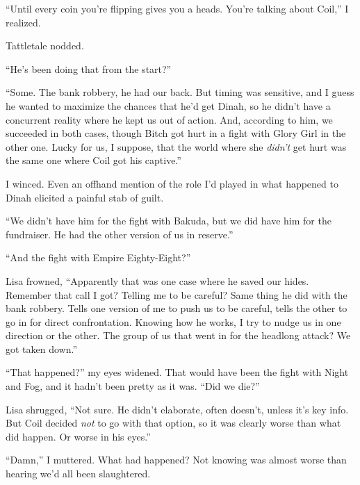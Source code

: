 ``Until every coin you're flipping gives you a heads.  You're talking about Coil,'' I realized.



Tattletale nodded.



``He's been doing that from the start?''



``Some.  The bank robbery, he had our back.  But timing was sensitive, and I guess he wanted to maximize the chances that he'd get Dinah, so he didn't have a concurrent reality where he kept us out of action.  And, according to him, we succeeded in both cases, though Bitch got hurt in a fight with Glory Girl in the other one.  Lucky for us, I suppose, that the world where she \emph{didn't }get hurt was the same one where Coil got his captive.''



I winced.  Even an offhand mention of the role I'd played in what happened to Dinah elicited a painful stab of guilt.



``We didn't have him for the fight with Bakuda, but we did have him for the fundraiser.  He had the other version of us in reserve.''



``And the fight with Empire Eighty-Eight?''



Lisa frowned, ``Apparently that was one case where he saved our hides.  Remember that call I got?  Telling me to be careful?  Same thing he did with the bank robbery.  Tells one version of me to push us to be careful, tells the other to go in for direct confrontation.  Knowing how he works, I try to nudge us in one direction or the other.  The group of us that went in for the headlong attack?  We got taken down.''



``That happened?'' my eyes widened.  That would have been the fight with Night and Fog, and it hadn't been pretty as it was.  ``Did we die?''



Lisa shrugged, ``Not sure.  He didn't elaborate, often doesn't, unless it's key info.  But Coil decided \emph{not} to go with that option, so it was clearly worse than what did happen.  Or worse in his eyes.''



``Damn,'' I muttered.  What had happened?  Not knowing was almost worse than hearing we'd all been slaughtered.



